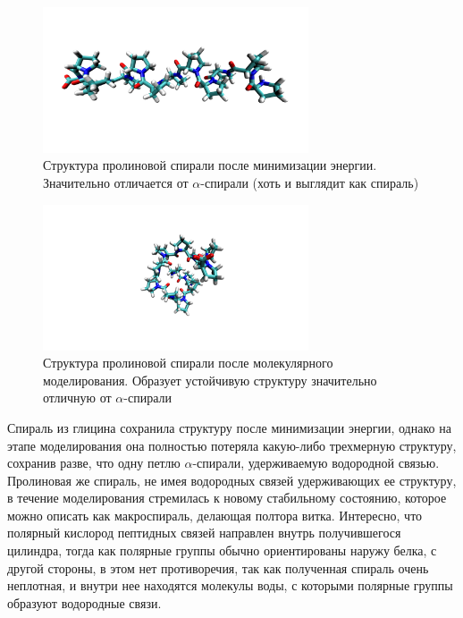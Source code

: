 \documentclass[
11pt,%
tightenlines,%
twoside,%
onecolumn,%
nofloats,%
nobibnotes,%
nofootinbib,%
superscriptaddress,%
noshowpacs,%
centertags]%
{revtex4}
\begin{document}
\begin{figure}[h]
	\centering
	\includegraphics[width=0.7\textwidth]{prolin_em}
	\caption{Структура пролиновой спирали после минимизации энергии. 
		Значительно отличается от $\alpha$-спирали (хоть и выглядит как спираль)}
\end{figure}
\begin{figure}[h]
	\centering
	\includegraphics[width=0.7\textwidth]{prolin_end}
	\caption{Структура пролиновой спирали после молекулярного моделирования. 
		Образует устойчивую структуру значительно отличную от $\alpha$-спирали}
\end{figure}

Спираль из глицина сохранила структуру после минимизации энергии, 
однако на этапе моделирования она полностью потеряла какую-либо трехмерную структуру,
сохранив разве, что одну петлю $\alpha$-спирали, удерживаемую водородной связью.
Пролиновая же спираль, не имея водородных связей удерживающих ее структуру, 
в течение моделирования стремилась к новому стабильному состоянию, 
которое можно описать как макроспираль, делающая полтора витка. 
Интересно, что полярный кислород пептидных связей направлен внутрь получившегося цилиндра,
тогда как полярные группы обычно ориентированы наружу белка, 
с другой стороны, в этом нет противоречия, так как полученная спираль очень неплотная,
и внутри нее находятся молекулы воды, с которыми полярные группы образуют водородные связи. \par
\end{document}
